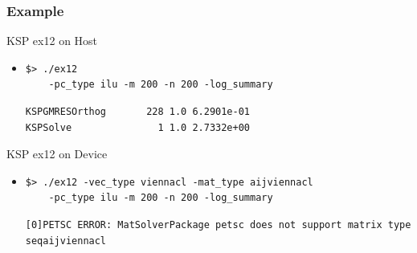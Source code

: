 \begin{frame}[fragile]
\frametitle{Example}
  \begin{block}{KSP ex12 on Host}
  \begin{itemize}
   \item
    \begin{lstlisting}
$> ./ex12
    -pc_type ilu -m 200 -n 200 -log_summary
    \end{lstlisting}
    \begin{lstlisting}
KSPGMRESOrthog       228 1.0 6.2901e-01
KSPSolve               1 1.0 2.7332e+00
    \end{lstlisting}

  \end{itemize}
  \end{block}

  
  \begin{block}{KSP ex12 on Device}
  \begin{itemize}
   \item
    \begin{lstlisting}
$> ./ex12 -vec_type viennacl -mat_type aijviennacl
    -pc_type ilu -m 200 -n 200 -log_summary
    \end{lstlisting}
    \begin{lstlisting}
[0]PETSC ERROR: MatSolverPackage petsc does not support matrix type seqaijviennacl
    \end{lstlisting}

  \end{itemize}
  \end{block}
  \vspace*{0.4cm}

\end{frame}


